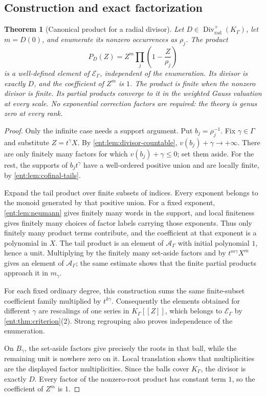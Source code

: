 \documentclass[11pt]{article}
\newtheorem{theorem}{Theorem}[section]
\theoremstyle{plain}
\theoremstyle{plain}
\theoremstyle{plain}
\theoremstyle{definition}
\theoremstyle{definition}
\theoremstyle{definition}
\theoremstyle{definition}
\theoremstyle{remark}
\newcommand{\K}{K_\Gamma}\newcommand{\KD}{K_\Delta}
\newcommand{\E}{\mathcal E_\Gamma}
\newcommand{\A}{\mathcal A_\Gamma}\newcommand{\OO}{\mathcal O_\Gamma}
\DeclareMathOperator{\Div}{Div}\DeclareMathOperator{\inpol}{in}
\begin{document}
\subsection{Construction and exact factorization}
\begin{theorem}[Canonical product for a radial divisor]
\label{ent:thm:product}
Let $D\in\Div^+_{\mathrm{rad}}(\K)$, let $m=D(0)$, and enumerate its nonzero
occurrences as $\rho_j$. The product
\begin{equation}\label{ent:eq:product}
 P_D(Z)=Z^m\prod_j\left(1-\frac Z{\rho_j}\right)
\end{equation}
is a well-defined element of $\E$, independent of the enumeration. Its
divisor is exactly $D$, and the coefficient of $Z^m$ is $1$. The product is
finite when the nonzero divisor is finite. Its partial products converge to
it in the weighted Gauss valuation at every scale. \emph{No exponential
correction factors are required}: the theory is genus zero at every rank.
\end{theorem}
\begin{proof}
Only the infinite case needs a support argument. Put $b_j=\rho_j^{-1}$. Fix
$\gamma\in\Gamma$ and substitute $Z=t^\gamma X$. By
\cref{ent:lem:divisor-countable}, $v(b_j)+\gamma\to+\infty$. There are only
finitely many factors for which $v(b_j)+\gamma\le0$; set them aside. For the
rest, the supports of $b_jt^\gamma$ have a well-ordered positive union and
are locally finite, by \cref{ent:lem:cofinal-tails}.

Expand the tail product over finite subsets of indices. Every exponent
belongs to the monoid generated by that positive union. For a fixed exponent,
\cref{ent:lem:neumann} gives finitely many words in the support, and local
finiteness gives finitely many choices of factor labels carrying those
exponents. Thus only finitely many product terms contribute, and the
coefficient at that exponent is a polynomial in $X$. The tail product is an
element of $\A$ with initial polynomial $1$, hence a unit. Multiplying by the
finitely many set-aside factors and by $t^{m\gamma}X^m$ gives an element of
$\A$; the same estimate shows that the finite partial products approach it in
$m_\gamma$.

For each fixed ordinary degree, this construction sums the same finite-subset
coefficient family multiplied by $t^{k\gamma}$. Consequently the elements
obtained for different $\gamma$ are rescalings of one series in $\K[[Z]]$,
which belongs to $\E$ by \cref{ent:thm:criterion}(2). Strong regrouping also
proves independence of the enumeration.

On $B_\gamma$, the set-aside factors give precisely the roots in that ball,
while the remaining unit is nowhere zero on it. Local translation shows that
multiplicities are the displayed factor multiplicities. Since the balls cover
$\K$, the divisor is exactly $D$. Every factor of the nonzero-root product
has constant term $1$, so the coefficient of $Z^m$ is $1$.
\end{proof}
\end{document}
